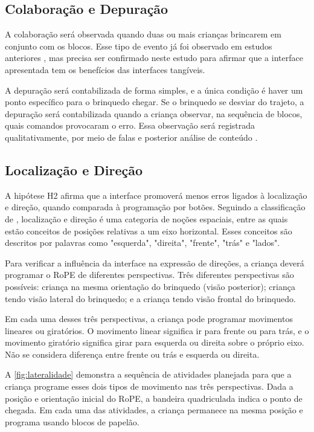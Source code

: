 \subsection{Colaboração e Depuração}

A colaboração será observada quando duas ou mais crianças brincarem em conjunto com os blocos. Esse tipo de evento já foi observado em estudos anteriores \cite{sapounidis_tangible_2019, raabe_estudo_2019}, mas precisa ser confirmado neste estudo para afirmar que a interface apresentada tem os benefícios das interfaces tangíveis. 

A depuração será contabilizada de forma simples, e a única condição é haver um ponto específico para o brinquedo chegar. Se o brinquedo se desviar do trajeto, a depuração será contabilizada quando a criança observar, na sequência de blocos, quais comandos provocaram o erro. Essa observação será registrada qualitativamente, por meio de falas e posterior análise de conteúdo \cite{bardin_alise_1979}.

\subsection{Localização e Direção}
A hipótese H2 afirma que a interface promoverá menos erros ligados à localização e direção, quando comparada à programação por botões. Seguindo a classificação de , localização e direção é uma categoria de noções espaciais, entre as quais estão conceitos de posições relativas a um eixo horizontal. Esses conceitos são descritos por palavras como "esquerda", "direita", "frente", "trás" e "lados". 

Para verificar a influência da interface na expressão de direções, a criança deverá programar o RoPE de diferentes perspectivas. Três diferentes perspectivas são possíveis: criança na mesma orientação do brinquedo (visão posterior); criança tendo visão lateral do brinquedo; e a criança tendo visão frontal do brinquedo.

Em cada uma desses três perspectivas, a criança pode programar movimentos lineares ou giratórios. O movimento linear significa ir para frente ou para trás, e o movimento giratório significa girar para esquerda ou direita sobre o próprio eixo. Não se considera diferença entre frente ou trás e esquerda ou direita.

A \autoref{fig:lateralidade} demonstra a sequência de atividades planejada para que a criança programe esses dois tipos de movimento nas três perspectivas. Dada a posição e orientação inicial do RoPE, a bandeira quadriculada indica o ponto de chegada. Em cada uma das atividades, a criança permanece na mesma posição e programa usando blocos de papelão.

